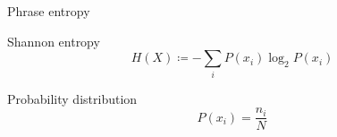 \documentclass[handout]{beamer}
\begin{document}
\begin{frame}{Phrase entropy}
    \begin{block}{Shannon entropy}
        \begin{equation*}
            H(X)\coloneq-\sum_i P(x_i)\log_2 P(x_i)
        \end{equation*}
    \end{block}
    \begin{block}{Probability distribution}
        \begin{equation*}
            P(x_i)=\frac{n_i}{N}
        \end{equation*}
    \end{block}
    \hfill\cite{li_automatic_2019}

\end{frame}
\end{document}
